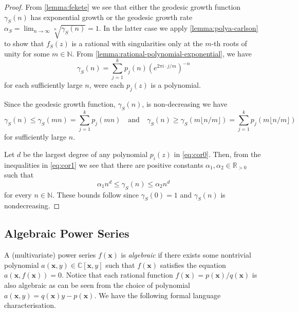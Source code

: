 \begin{proof}
	From \cref{lemma:fekete} we see that either the geodesic growth function $\gamma_S(n)$ has exponential growth or the geodesic growth rate $\alpha_S = \lim_{n \to \infty} \sqrt[n]{\gamma_S(n)} = 1$.
	In the latter case we apply \cref{lemma:polya-carlson} to show that $f_S(z)$ is a rational with singularities only at the $m$-th roots of unity for some $m \in \mathbb{N}$.
	From \cref{lemma:rational-polynomial-exponential}, we have
	\begin{equation}\label{eq:cor0}
		\gamma_S(n) = \sum_{j = 1}^{k} p_j(n)
		\left(
			e^{ 2 \pi i \cdot j/m}
		\right)^{-n}
	\end{equation}
	for each sufficiently large $n$, were each $p_j(z)$ is a polynomial.
	
	Since the geodesic growth function, $\gamma_S(n)$, is non-decreasing we have
	\begin{equation}\label{eq:cor1}
		\gamma_S(n)
		\leqslant
		\gamma_S(mn)
		=
		\sum_{j=1}^{k} p_j(mn)
	\quad
	\text{and}
	\quad
		\gamma_S(n)
		\geqslant
		\gamma_S( m \lfloor n/m \rfloor )
		=
		\sum_{j=1}^{k} p_j(m \lfloor n/m \rfloor)
	\end{equation}
	for sufficiently large $n$.
	
	Let $d$ be the largest degree of any polynomial $p_i(z)$ in \eqref{eq:cor0}.
	Then, from the inequalities in \eqref{eq:cor1} we see that there are positive constants $\alpha_1,\alpha_2 \in \mathbb{R}_{>0}$ such that
	\[
		\alpha_1 n^d
			\leqslant
		\gamma_S(n)
			\leqslant
		\alpha_2 n^d
	\]
	for every $n \in \mathbb{N}$.
	These bounds follow since $\gamma_S(0) = 1$ and $\gamma_S(n)$ is nondecreasing.
\end{proof}

\subsection{Algebraic Power Series}\label{sec:algebraic-functions}

A (multivariate) power series $f(\mathbf{x})$ is \emph{algebraic} if there exists some nontrivial polynomial $a(\mathbf{x},y) \in \mathbb{C}[\mathbf{x},y]$ such that $f(\mathbf{x})$ satisfies the equation $a(\mathbf{x}, f(\mathbf{x})) = 0$.
Notice that each rational function $f(\mathbf{x}) = p(\mathbf{x})/q(\mathbf{x})$ is also algebraic as can be seen from the choice of polynomial $a(\mathbf{x},y) = q(\mathbf{x}) y - p(\mathbf{x})$.
We have the following formal language characterisation.

